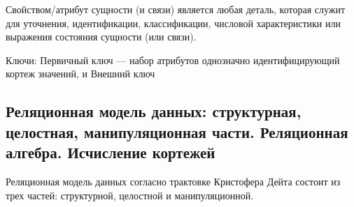 Свойством/атрибут сущности (и связи) является любая деталь, которая служит для уточнения, идентификации, классификации, числовой характеристики или выражения состояния сущности (или связи).

Ключи: Первичный ключ --- набор атрибутов однозначно идентифицирующий кортеж значений, и Внешний ключ

\newpage

\subsection{Реляционная модель данных: структурная, целостная, манипуляционная части. Реляционная алгебра. Исчисление кортежей}

Реляционная модель данных согласно трактовке Кристофера Дейта состоит из трех частей: структурной, целостной и манипуляционной.

